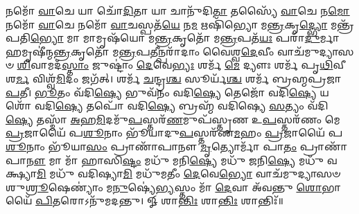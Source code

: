 𑌨𑌮𑍋᳴ \ul{𑌵𑌾}\-𑌚𑍇 𑌯𑌾 𑌚𑍋᳴\-\ul{𑌦𑌿}\-𑌤𑌾 𑌯𑌾 𑌚𑌾𑌨𑍁᳴𑌦𑌿\-\ul{𑌤𑌾} 𑌤𑌸𑍍𑌯𑍈᳴ \ul{𑌵𑌾}\-𑌚𑍇 𑌨\-\ul{𑌮𑍋} 𑌨𑌮𑍋᳴ \ul{𑌵𑌾}\-𑌚𑍇 𑌨𑌮𑍋᳴ \ul{𑌵𑌾}\-𑌚𑌸𑍍𑌪𑌤᳴\-\ul{𑌯𑍇} 𑌨\-\ul{𑌮} 𑌋𑌷𑌿᳴𑌭𑍍𑌯𑍋 𑌮\-\ul{𑌨𑍍𑌤𑍍𑌰}\-𑌕𑍃\-\ul{𑌦𑍍𑌭𑍍𑌯𑍋} 𑌮𑌨𑍍𑌤𑍍𑌰᳴𑌪𑌤𑌿\-\ul{𑌭𑍍𑌯𑍋} 𑌮𑌾 𑌮𑌾𑌮𑍃𑌷᳴𑌯𑍋 𑌮\-\ul{𑌨𑍍𑌤𑍍𑌰}\-𑌕𑍃𑌤𑍋᳴ 𑌮\-\ul{𑌨𑍍𑌤𑍍𑌰}\-𑌪𑌤᳴\-\ul{𑌯𑌃} 𑌪𑌰𑌾᳴\-\ul{𑌦𑍁}\-𑌰𑍍𑌮𑌾𑌹𑌮𑍃𑌷𑍀॑𑌨𑍍𑌮\-\ul{𑌨𑍍𑌤𑍍𑌰}\-𑌕𑍃𑌤𑍋᳴ 𑌮\-\ul{𑌨𑍍𑌤𑍍𑌰}\-𑌪\-\ul{𑌤𑍀}\-𑌨𑍍𑌪𑌰𑌾᳴𑌦𑌾𑌂 𑌵𑍈𑌶𑍍𑌵\-\ul{𑌦𑍇}\-𑌵𑍀𑌂 𑌵𑌾𑌚᳴𑌮𑍁𑌦𑍍𑌯𑌾𑌸𑍞 \ul{𑌶𑌿}\-𑌵𑌾𑌮𑌦᳴\-\ul{𑌸𑍍𑌤𑌾𑌂} 𑌜𑍁𑌷𑍍𑌟𑌾𑌂॑ \ul{𑌦𑍇}\-𑌵𑍇\-\ul{𑌭𑍍𑌯𑌃} 𑌶𑌰𑍍𑌮᳴ \ul{𑌮𑍇} 𑌦𑍍𑌯𑍗𑌃  𑌶𑌰𑍍𑌮᳴ 𑌪𑍃\-\ul{𑌥𑌿}\-𑌵𑍀 𑌶\-\ul{𑌰𑍍𑌮} 𑌵𑌿𑌶𑍍𑌵᳴\-\ul{𑌮𑌿}\-𑌦𑌂 𑌜𑌗᳴𑌤𑍍। 
𑌶𑌰𑍍𑌮᳴ \ul{𑌚}\-𑌨𑍍𑌦𑍍𑌰\-\ul{𑌶𑍍𑌚} 𑌸𑍂𑌰𑍍𑌯᳴\-\ul{𑌶𑍍𑌚} 𑌶𑌰𑍍𑌮᳴ 𑌬𑍍𑌰𑌹𑍍𑌮𑌪𑍍𑌰𑌜𑌾\-\ul{𑌪}\-𑌤𑍀। 
\-\ul{𑌭𑍂}\-𑌤𑌂 𑌵᳴𑌦𑌿\-\ul{𑌷𑍍𑌯𑍇} 𑌭𑍁𑌵᳴𑌨𑌂 𑌵𑌦𑌿\-\ul{𑌷𑍍𑌯𑍇} 𑌤𑍇𑌜𑍋᳴ 𑌵𑌦𑌿\-\ul{𑌷𑍍𑌯𑍇} 𑌯𑌶𑍋᳴ 𑌵𑌦𑌿\-\ul{𑌷𑍍𑌯𑍇} 𑌤𑌪𑍋᳴ 𑌵𑌦𑌿\-\ul{𑌷𑍍𑌯𑍇} 𑌬𑍍𑌰𑌹𑍍𑌮᳴ 𑌵𑌦𑌿𑌷𑍍𑌯𑍇 \ul{𑌸}\-𑌤𑍍𑌯𑌂 𑌵᳴𑌦𑌿\-\ul{𑌷𑍍𑌯𑍇} 𑌤𑌸𑍍𑌮𑌾᳴ \ul{𑌅}\-𑌹\-\ul{𑌮𑌿}\-𑌦𑌮𑍁᳴\-\ul{𑌪}\-𑌸𑍍𑌤𑌰᳴\-\ul{𑌣}\-𑌮𑍁𑌪᳴𑌸𑍍𑌤𑍃𑌣 𑌉\-\ul{𑌪}\-𑌸𑍍𑌤𑌰᳴𑌣𑌂 𑌮𑍇 \ul{𑌪𑍍𑌰}\-𑌜𑌾𑌯𑍈᳴ 𑌪\-\ul{𑌶𑍂}\-𑌨𑌾𑌂 𑌭𑍂᳴𑌯𑌾𑌦𑍁\-\ul{𑌪}\-𑌸𑍍𑌤𑌰᳴𑌣\-\ul{𑌮}\-𑌹𑌂 \ul{𑌪𑍍𑌰}\-𑌜𑌾𑌯𑍈᳴ 𑌪\-\ul{𑌶𑍂}\-𑌨𑌾𑌂 𑌭𑍂᳴𑌯𑌾\-\ul{𑌸𑌂} 𑌪𑍍𑌰𑌾𑌣𑌾᳴𑌪𑌾𑌨𑍗 \ul{𑌮𑍃}\-𑌤𑍍𑌯𑍋𑌰𑍍𑌮𑌾᳴ 𑌪𑌾\-\ul{𑌤𑌂} 𑌪𑍍𑌰𑌾𑌣𑌾᳴𑌪𑌾\-\ul{𑌨𑍗} 𑌮𑌾 𑌮𑌾᳴ 𑌹𑌾𑌸𑌿\-\ul{𑌷𑍍𑌟𑌂} 𑌮𑌧𑍁᳴ 𑌮𑌨𑌿\-\ul{𑌷𑍍𑌯𑍇} 𑌮𑌧𑍁᳴ 𑌜𑌨𑌿\-\ul{𑌷𑍍𑌯𑍇} 𑌮𑌧𑍁᳴ 𑌵𑌕𑍍𑌷𑍍𑌯𑌾\-\ul{𑌮𑌿} 𑌮𑌧𑍁᳴ 𑌵𑌦𑌿𑌷𑍍𑌯𑌾\-\ul{𑌮𑌿} 𑌮𑌧𑍁᳴𑌮𑌤𑍀𑌂 \ul{𑌦𑍇}\-𑌵𑍇\-\ul{𑌭𑍍𑌯𑍋} 𑌵𑌾𑌚᳴𑌮𑍁𑌦𑍍𑌯𑌾𑌸𑍞 𑌶𑍁\-\ul{𑌶𑍍𑌰𑍂}\-𑌷𑍇𑌣𑍍𑌯𑌾𑌂॑ 𑌮\-\ul{𑌨𑍁}\-𑌷𑍍𑌯𑍇॑\-\ul{𑌭𑍍𑌯}\-𑌸𑍍𑌤𑌂 𑌮𑌾᳴ \ul{𑌦𑍇}\-𑌵𑌾 𑌅᳴𑌵𑌨𑍍𑌤𑍁 \ul{𑌶𑍋}\-𑌭𑌾𑌯𑍈᳴ \ul{𑌪𑌿}\-𑌤𑌰𑍋𑌽𑌨𑍁᳴𑌮𑌦𑌨𑍍𑌤𑍁। 
𑍐 𑌶𑌾\-\ul{𑌨𑍍𑌤𑌿𑌃} 𑌶𑌾\-\ul{𑌨𑍍𑌤𑌿𑌃} 𑌶𑌾𑌨𑍍𑌤𑌿𑌃᳴॥ 

\closesection
